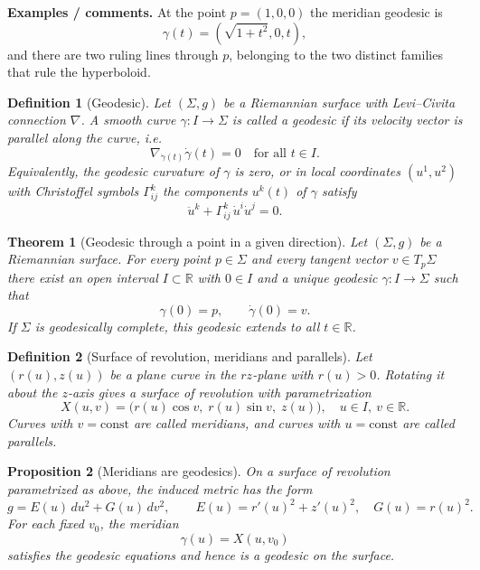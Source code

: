 \documentclass[12pt,a4paper]{article}
\theoremstyle{plain}
\newtheorem{theorem}{Theorem}[section]
\newtheorem{proposition}[theorem]{Proposition}
\newtheorem{definition}{Definition}
\theoremstyle{definition}      %
\begin{document}
	\medskip
	\textbf{Examples / comments.}
	At the point $p=(1,0,0)$ the meridian geodesic is
	\[
	\gamma(t)=(\sqrt{1+t^2},0,t),
	\]
	and there are two ruling lines through $p$, belonging to the two distinct
	families that rule the hyperboloid.
	
	
	\begin{definition}[Geodesic]
		Let $(\Sigma,g)$ be a Riemannian surface with Levi--Civita connection
		$\nabla$. A smooth curve $\gamma:I\to\Sigma$ is called a \emph{geodesic} if
		its velocity vector is parallel along the curve, i.e.
		\[
		\nabla_{\dot\gamma(t)}\dot\gamma(t) = 0
		\quad\text{for all } t\in I.
		\]
		Equivalently, the geodesic curvature of $\gamma$ is zero, or in local
		coordinates $(u^1,u^2)$ with Christoffel symbols $\Gamma^k_{ij}$ the
		components $u^k(t)$ of $\gamma$ satisfy
		\[
		\ddot u^k + \Gamma^{k}_{ij}\,\dot u^i \dot u^j = 0.
		\]
	\end{definition}
	
	\begin{theorem}[Geodesic through a point in a given direction]
		Let $(\Sigma,g)$ be a Riemannian surface. For every point $p\in\Sigma$
		and every tangent vector $v\in T_p\Sigma$ there exist an open interval
		$I\subset\mathbb R$ with $0\in I$ and a unique geodesic
		$\gamma:I\to\Sigma$ such that
		\[
		\gamma(0)=p,\qquad \dot\gamma(0)=v.
		\]
		If $\Sigma$ is geodesically complete, this geodesic extends to all
		$t\in\mathbb R$.
	\end{theorem}
	
	\begin{definition}[Surface of revolution, meridians and parallels]
		Let $(r(u),z(u))$ be a plane curve in the $rz$-plane with $r(u)>0$.
		Rotating it about the $z$-axis gives a surface of revolution with
		parametrization
		\[
		X(u,v) = \bigl(r(u)\cos v,\; r(u)\sin v,\; z(u)\bigr),
		\quad u\in I,\ v\in\mathbb R.
		\]
		Curves with $v=\mathrm{const}$ are called \emph{meridians}, and curves
		with $u=\mathrm{const}$ are called \emph{parallels}.
	\end{definition}
	
	\begin{proposition}[Meridians are geodesics]
		On a surface of revolution parametrized as above, the induced metric has
		the form
		\[
		g = E(u)\,du^2 + G(u)\,dv^2, \qquad
		E(u) = r'(u)^2 + z'(u)^2,\quad G(u)=r(u)^2.
		\]
		For each fixed $v_0$, the meridian
		\[
		\gamma(u) = X(u,v_0)
		\]
		satisfies the geodesic equations and hence is a geodesic on the surface.
	\end{proposition}
	
\end{document}
